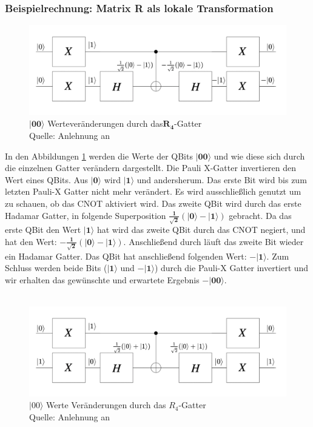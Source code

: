 \subsubsection{Beispielrechnung: Matrix R als lokale Transformation}
 \begin{figure}[hbtp]
	\centering
	\includegraphics[width=.8\textwidth]{figures/RGatter00.png}
	\caption{$\mathbf{|00\rangle}$ Werteveränderungen durch das$\mathbf{R_4}$-Gatter \\ Quelle: Anlehnung an \cite[S. 145]{Ho17}}
	\label{fig:Rgatter00}
\end{figure}
 In den Abbildungen \ref{fig:Rgatter00} werden die Werte der QBits $\mathbf{|00\rangle}$ und wie diese sich durch die einzelnen Gatter verändern dargestellt.
 Die Pauli X-Gatter invertieren den Wert eines QBits. Aus $\mathbf{|0\rangle}$ wird $\mathbf{|1\rangle}$ und andersherum. Das erste Bit wird bis zum letzten Pauli-X Gatter nicht mehr verändert. Es wird ausschließlich genutzt um zu schauen, ob das CNOT aktiviert wird. Das zweite QBit wird durch das erste Hadamar Gatter, in folgende Superposition $\mathbf{\frac{1}{\sqrt 2}(|0\rangle - |1\rangle)}$ gebracht. Da das erste QBit den Wert $\mathbf{|1\rangle}$ hat wird das zweite QBit durch das CNOT negiert, und hat den Wert: $\mathbf{-\frac{1}{\sqrt 2}(|0\rangle - |1\rangle)}$. Anschließend durch läuft das zweite Bit wieder ein Hadamar Gatter. Das QBit hat anschließend folgenden Wert: $\mathbf{-|1\rangle}$.
 Zum Schluss werden beide Bits ($\mathbf{|1\rangle}$ und $\mathbf{-|1\rangle}$) durch die Pauli-X Gatter invertiert und wir erhalten das gewünschte und erwartete Ergebnis $\mathbf{-|00\rangle}$.
  \\
  \\
   \begin{figure}[hbtp]
  	\centering
  	\includegraphics[width=.8\textwidth]{figures/RGatter01.png}
  	\caption{$|00\rangle$ Werte Veränderungen durch das $R_4$-Gatter \\ Quelle: Anlehnung an \cite[S. 145]{Ho17}}
  	\label{fig:Rgatter01}
  \end{figure}
